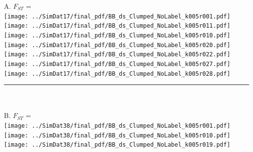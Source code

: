 \documentclass[varwidth=true, border={80, 10}]{standalone}
\newlength{\nameraise}
\newlength{\nameoverhang}
\begin{document}
 
 A. $F_{ST}$ = \\
\texttt{[image: ../SimDat17/final\_pdf/BB\_ds\_Clumped\_NoLabel\_k005r001.pdf]}~\hspace*{-\nameoverhang}\raisebox{\nameraise}{STRUCTURE A.C (9/9)} \\
\texttt{[image: ../SimDat17/final\_pdf/BB\_ds\_Clumped\_NoLabel\_k005r011.pdf]}~\hspace*{-\nameoverhang}\raisebox{\nameraise}{STRUCTURE NA.C (8/9)} \\
\texttt{[image: ../SimDat17/final\_pdf/BB\_ds\_Clumped\_NoLabel\_k005r010.pdf]}~\hspace*{-\nameoverhang}\raisebox{\nameraise}{STRUCTURE NA.C  (1/9)} \\
\texttt{[image: ../SimDat17/final\_pdf/BB\_ds\_Clumped\_NoLabel\_k005r020.pdf]}~\hspace*{-\nameoverhang}\raisebox{\nameraise}{STRUCTURE NA.NC  (7/9)} \\
\texttt{[image: ../SimDat17/final\_pdf/BB\_ds\_Clumped\_NoLabel\_k005r022.pdf]}~\hspace*{-\nameoverhang}\raisebox{\nameraise}{STRUCTURE NA.NC  (1/9)} \\
\texttt{[image: ../SimDat17/final\_pdf/BB\_ds\_Clumped\_NoLabel\_k005r027.pdf]}~\hspace*{-\nameoverhang}\raisebox{\nameraise}{STRUCTURE NA.NC  (1/9)} \\
\texttt{[image: ../SimDat17/final\_pdf/BB\_ds\_Clumped\_NoLabel\_k005r028.pdf]}~\hspace*{-\nameoverhang}\raisebox{\nameraise}{FLOCKTURE (9/9)} \\
\noindent\rule[.5cm]{8.2in}{0.4pt}\\
\vspace{-2.5em}\\
B. $F_{ST}$ = \\
\texttt{[image: ../SimDat38/final\_pdf/BB\_ds\_Clumped\_NoLabel\_k005r001.pdf]}~\hspace*{-\nameoverhang}\raisebox{\nameraise}{STRUCTURE A.C (9/9)} \\
\texttt{[image: ../SimDat38/final\_pdf/BB\_ds\_Clumped\_NoLabel\_k005r010.pdf]}~\hspace*{-\nameoverhang}\raisebox{\nameraise}{STRUCTURE NA.C (9/9)} \\
\texttt{[image: ../SimDat38/final\_pdf/BB\_ds\_Clumped\_NoLabel\_k005r019.pdf]}~\hspace*{-\nameoverhang}\raisebox{\nameraise}{STRUCTURE NA.NC  (9/9)} \\
\end{document}
